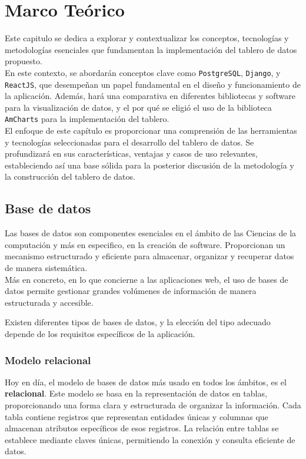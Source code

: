 \setlength{\arrayrulewidth}{0.5mm}
\setlength{\tabcolsep}{18pt}
\renewcommand{\arraystretch}{1.5}


\chapter{Marco Teórico} \label{cap:antecedentes}




Este capitulo se dedica a explorar y contextualizar los conceptos, tecnologías y metodologías esenciales que fundamentan la implementación del tablero de datos propuesto. \\

En este contexto, se abordarán conceptos clave como \texttt{PostgreSQL}, \texttt{Django}, y \texttt{ReactJS}, que desempeñan un papel fundamental en el diseño y funcionamiento de la aplicación. Además, hará una comparativa en diferentes bibliotecas y software para la visualización de datos, y el por qué se eligió el uso de la biblioteca \texttt{AmCharts} para la implementación del tablero.\\

El enfoque de este capítulo es proporcionar una comprensión  de las herramientas y tecnologías seleccionadas para el desarrollo del tablero de datos. Se profundizará en sus características, ventajas y casos de uso relevantes, estableciendo así una base sólida para la posterior discusión de la metodología y la construcción del tablero de datos.

\section{Base de datos}\label{sec:basedatos}
Las bases de datos son componentes esenciales en el ámbito de las Ciencias de la computación y más en especifico, en la creación de software. Proporcionan un mecanismo estructurado y eficiente para almacenar, organizar y recuperar datos de manera sistemática. \\
Más en concreto, en lo que concierne a las aplicaciones web, el uso de bases de datos permite gestionar grandes volúmenes de información de manera estructurada y accesible.

Existen diferentes tipos de bases de datos, y la elección del tipo adecuado depende de los requisitos específicos de la aplicación. \\

\subsection{Modelo relacional}
Hoy en día, el modelo de bases de datos más usado en todos los ámbitos, es el \textbf{relacional}. Este modelo se basa en la representación de datos en tablas, proporcionando una forma clara y estructurada de organizar la información. Cada tabla contiene registros que representan entidades únicas y columnas que almacenan atributos específicos de esos registros. La relación entre tablas se establece mediante claves únicas, permitiendo la conexión y consulta eficiente de datos.

